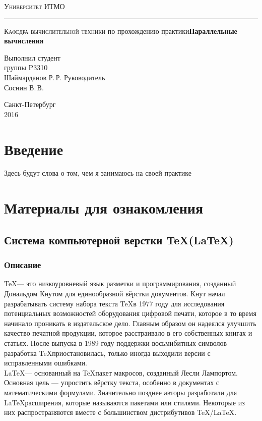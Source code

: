 \documentclass{article}
\author{Шаймарданов Р. Р.}
\begin{document}
\begin{titlepage}
	\begin{center}
		{\large\textsc{Университет ИТМО}}
		\vskip 1pt \hrule \vskip 3pt
		{\large\textsc{Кафедра вычислительной техники}}
		\vfill
		{ по прохождению практики\vskip 12pt\bfseries Параллельные вычисления}	
	\end{center}
	\vfill	
	\begin{flushright}
		{Выполнил студент\\группы P3310\\Шаймарданов Р.\,Р.\vskip 12pt Руководитель\\Соснин В.\,В.}
	\end{flushright}	
	\vfill	
	\begin{center}
		Санкт-Петербург\\2016
	\end{center}
\end{titlepage}

\tableofcontents
\newpage

\section{Введение}
	Здесь будут слова о том, чем я занимаюсь на своей практике
\newpage
\section{Материалы для ознакомления}	
	\subsection{Система компьютерной верстки \TeX(\LaTeX)}
		\subsubsection{Описание}
	\TeX — это низкоуровневый язык разметки и программирования, созданный Дональдом Кнутом для единообразной вёрстки документов. Кнут начал разрабатывать систему набора текста \TeX в 1977 году для исследования потенциальных возможностей оборудования цифровой печати, которое в то время начинало проникать в издательское дело. Главным образом он надеялся улучшить качество печатной продукции, которое расстраивало в его собственных книгах и статьях. После выпуска в 1989 году поддержки восьмибитных символов разработка \TeX приостановилась, только иногда выходили версии с исправленными ошибками.\\

	\LaTeX  — основанный на \TeX пакет макросов, созданный Лесли Лампортом. Основная цель — упростить вёрстку текста, особенно в документах с математическими формулами. Значительно позднее авторы разработали для \LaTeX расширения, которые называются пакетами или стилями. Некоторые из них распространяются вместе с большинством дистрибутивов \TeX/\LaTeX.\\
\end{document}
